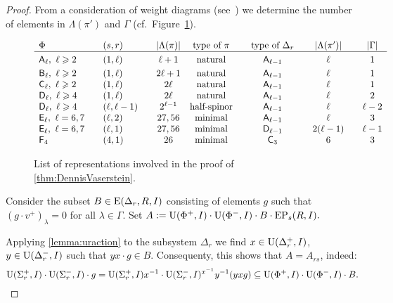\begin{proof}
From a consideration of weight diagrams (see~\cite{PSV98}) we determine the number of elements in $\Lambda(\pi')$ and $\Gamma$ (cf.~Figure~\ref{fig:table}).
\begin{figure}
\[\begin{array}{l @{\qquad} l @{\qquad} c @{\quad} c @{\qquad} c @{\qquad} c @{\qquad} c}
\Phi                                 & (s,r)         & |\Lambda(\pi)| & \text{type of $\pi$} & \text{type of $\Delta_r$} & |\Lambda(\pi')|& |\Gamma|  \\ \hline\vphantom{\Bigl(}
\rA_\ell,\ \ell\geqslant 2           & (1,\ell)      & \ell+1         & \text{natural}       & \rA_{\ell-1}              & \ell           & 1  \\     
\rB_\ell,\ \ell\geqslant 2           & (1,\ell)      & 2\ell+1        & \text{natural}       & \rA_{\ell-1}              & \ell           & 1  \\     
\rC_\ell,\ \ell\geqslant 2           & (1,\ell)      & 2\ell          & \text{natural}       & \rA_{\ell-1}              & \ell           & 1  \\
\rD_\ell,\ \ell\geqslant 4           & (1,\ell)      & 2\ell          & \text{natural}       & \rA_{\ell-1}              & \ell           & 2  \\ 
\rD_\ell,\ \ell\geqslant 4           & (\ell,\ell-1) & 2^{\ell-1}     & \text{half-spinor}   & \rA_{\ell-1}              & \ell           & \ell-2  \\
\rE_\ell,\ \ell=6,7                  & (\ell,2)      & 27, 56         & \text{minimal}       & \rA_{\ell-1}              & \ell           & 3       \\ 
\rE_\ell,\ \ell=6,7                  & (\ell,1)      & 27, 56         & \text{minimal}       & \rD_{\ell-1}              & 2(\ell-1)      & \ell-1  \\
\rF_4                                & (4, 1)        & 26             & \text{minimal}       & \rC_3                     & 6              & 3\end{array}\]
 \caption[Table]{List of representations involved in the proof of \cref{thm:DennisVaserstein}.} \label{fig:table}
\end{figure}
Consider the subset $B \in \operatorname{E}(\Delta_r, R, I)$ consisting of elements $g$ such that $(g \cdot v^+)_\lambda = 0$ for all $\lambda\in\Gamma$.
Set $A:=\operatorname{U}(\Phi^+, I)\cdot \operatorname{U}(\Phi^-, I) \cdot B \cdot \operatorname{EP}_s(R, I).$

Applying \cref{lemma:uraction} to the subsystem $\Delta_r$ we find
$x\in\operatorname{U}(\Delta_r^+, I)$, $y\in \operatorname{U}(\Delta_r^-, I)$ such that $yx\cdot g \in B$.
Consequenty, this shows that $A = A_{rs}$, indeed:
\begin{equation*} \operatorname{U}(\Sigma^+_r, I) \cdot \operatorname{U}(\Sigma^-_r, I) \cdot g = \operatorname{U}(\Sigma^+_r, I) x^{-1} \cdot \operatorname{U}(\Sigma^-_r, I)^{x^{-1}} y^{-1} (yxg) \subseteq \operatorname{U}(\Phi^+, I) \cdot \operatorname{U}(\Phi^-, I) \cdot B. \end{equation*}


\end{proof}

